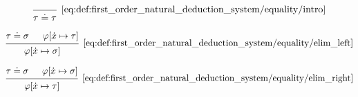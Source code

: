 \begin{definition}
\begin{thmenum}
    \begin{minipage}{0.3\textwidth}
      \begin{equation*}\taglabel[\( \syneq^+ \)]{eq:def:first_order_natural_deduction_system/equality/intro}
        \begin{prooftree}
          \infer0[\ref{eq:def:first_order_natural_deduction_system/equality/intro}]{ \tau \syneq \tau }
        \end{prooftree}
      \end{equation*}
    \end{minipage}
    \hfill
    \begin{minipage}{0.3\textwidth}
      \begin{equation*}\taglabel[\( \syneq_L^- \)]{eq:def:first_order_natural_deduction_system/equality/elim_left}
        \begin{prooftree}
          \hypo{ \tau \syneq \sigma }
          \hypo{ \varphi[\synx \mapsto \tau] }
          \infer2[\ref{eq:def:first_order_natural_deduction_system/equality/elim_left}]{ \varphi[\synx \mapsto \sigma] }
        \end{prooftree}
      \end{equation*}
    \end{minipage}
    \hfill
    \begin{minipage}{0.3\textwidth}
      \begin{equation*}\taglabel[\( \syneq_L^+ \)]{eq:def:first_order_natural_deduction_system/equality/elim_right}
        \begin{prooftree}
          \hypo{ \tau \syneq \sigma }
          \hypo{ \varphi[\synx \mapsto \sigma] }
          \infer2[\ref{eq:def:first_order_natural_deduction_system/equality/elim_right}]{ \varphi[\synx \mapsto \tau] }
        \end{prooftree}
      \end{equation*}
    \end{minipage}
  \end{thmenum}
\end{definition}

